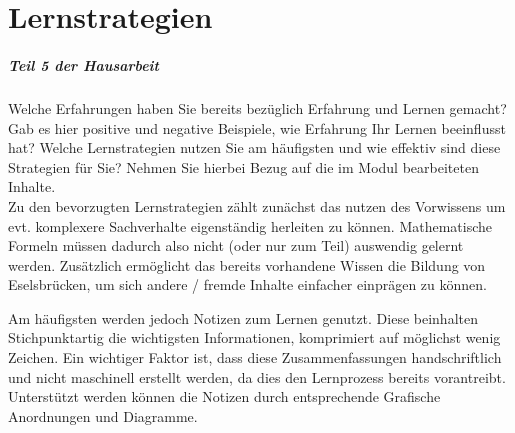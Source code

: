 %
\chapter{Lernstrategien}
\label{sec:lernstrategien}

\paragraph{Teil 5 der Hausarbeit}
Welche Erfahrungen haben Sie bereits bezüglich Erfahrung und Lernen gemacht? Gab es hier positive und negative Beispiele, wie Erfahrung Ihr Lernen beeinflusst hat? Welche Lernstrategien nutzen Sie am häufigsten und wie effektiv sind diese Strategien für Sie? Nehmen Sie hierbei Bezug auf die im Modul bearbeiteten Inhalte. \\[0.4em]

Zu den bevorzugten Lernstrategien zählt zunächst das nutzen des Vorwissens um evt. komplexere Sachverhalte eigenständig herleiten zu können. Mathematische Formeln müssen dadurch also nicht (oder nur zum Teil) auswendig gelernt werden. Zusätzlich ermöglicht das bereits vorhandene Wissen die Bildung von Eselsbrücken, um sich andere / fremde Inhalte einfacher einprägen zu können.

Am häufigsten werden jedoch Notizen zum Lernen genutzt. Diese beinhalten Stichpunktartig die wichtigsten Informationen, komprimiert auf möglichst wenig Zeichen. Ein wichtiger Faktor ist, dass diese Zusammenfassungen handschriftlich und nicht maschinell erstellt werden, da dies den Lernprozess bereits vorantreibt. Unterstützt werden können die Notizen durch entsprechende Grafische Anordnungen und Diagramme.
